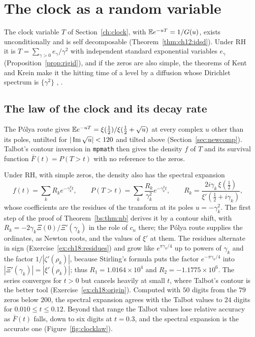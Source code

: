 \section{The clock as a random variable}\label{ch:clocklaw}

The clock variable $T$ of Section~\ref{ch:clock}, with $\mathbb{E} e^{-uT}=1/G(u)$, exists unconditionally and is self decomposable (Theorem~\ref{thm:ch12:idsd}). Under RH it is $T=\sum_{\gamma>0}e_\gamma/\gamma^2$ with independent standard exponential variables $e_\gamma$ (Proposition~\ref{prop:rigid}), and if the zeros are also simple, the theorems of Kent and Krein make it the hitting time of a level by a diffusion whose Dirichlet spectrum is $\{\gamma^2\}$ \cite{Kent80}, \cite[Section 16.3]{P26}.

\subsection{The law of the clock and its decay rate}\label{sec:ch18:law}

The P\'olya route gives $\mathbb{E} e^{-uT}=\xi(\tfrac12)/\xi(\tfrac12+\sqrt u)$ at every complex $u$ other than its poles, untilted for $|\operatorname{Im}\sqrt u|<120$ and tilted above (Section~\ref{sec:newcomp}). Talbot's contour inversion \cite{Talbot79} in \texttt{mpmath} \cite{mpmath} then gives the density $f$ of $T$ and its survival function $\bar F(t)=P(T>t)$ with no reference to the zeros.

Under RH, with simple zeros, the density also has the spectral expansion \cite{Kent80}
\[
f(t)=\sum_k R_ke^{-\gamma_k^2t},\qquad P(T>t)=\sum_k\frac{R_k}{\gamma_k^2}e^{-\gamma_k^2t},\qquad R_k=\frac{2i\gamma_k\,\xi(\tfrac12)}{\xi'(\tfrac12+i\gamma_k)},
\]
whose coefficients are the residues of the transform at its poles $u=-\gamma_k^2$. The first step of the proof of Theorem~\ref{bs:thm:nb} derives it by a contour shift, with $R_k=-2\gamma_k\Xi(0)/\Xi'(\gamma_k)$ in the role of $c_n$ there; the P\'olya route supplies the ordinates, as Newton roots, and the values of $\xi'$ at them. The residues alternate in sign (Exercise~\ref{ex:ch18:residues}) and grow like $e^{\pi\gamma_k/4}$ up to powers of $\gamma_k$ and the factor $1/|\zeta'(\rho_k)|$, because Stirling's formula puts the factor $e^{-\pi\gamma_k/4}$ into $|\Xi'(\gamma_k)|=|\xi'(\rho_k)|$; thus $R_1=1.0164\times10^4$ and $R_2=-1.1775\times10^6$. The series converges for $t>0$ but cancels heavily at small $t$, where Talbot's contour is the better tool (Exercise~\ref{ex:ch18:origin}). Computed with $50$ digits from the $79$ zeros below $200$, the spectral expansion agrees with the Talbot values to $24$ digits for $0.010\le t\le0.12$. Beyond that range the Talbot values lose relative accuracy as $\bar F(t)$ falls, down to six digits at $t=0.3$, and the spectral expansion is the accurate one (Figure~\ref{fig:clocklaw}).

